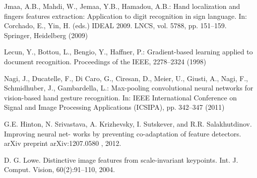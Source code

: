 \documentclass[conference]{IEEEtran}
\begin{document}
%
%
%
\begin{thebibliography}{1}

Jmaa, A.B., Mahdi, W., Jemaa, Y.B., Hamadou, A.B.: Hand localization and fingers features extraction: Application to digit recognition in sign language. In: Corchado, E., Yin, H. (eds.) IDEAL 2009. LNCS, vol. 5788, pp. 151–159. Springer, Heidelberg (2009)

Lecun, Y., Bottou, L., Bengio, Y., Haffner, P.: Gradient-based learning applied to document recognition. Proceedings of the IEEE, 2278–2324 (1998)

Nagi, J., Ducatelle, F., Di Caro, G., Ciresan, D., Meier, U., Giusti, A., Nagi, F.,
Schmidhuber, J., Gambardella, L.: Max-pooling convolutional neural networks for
vision-based hand gesture recognition. In: IEEE International Conference on Signal
and Image Processing Applications (ICSIPA), pp. 342–347 (2011)

G.E. Hinton, N. Srivastava, A. Krizhevsky, I. Sutskever, and R.R. Salakhutdinov. Improving neural net-
works by preventing co-adaptation of feature detectors.
arXiv preprint arXiv:1207.0580
, 2012.

D. G. Lowe. Distinctive image features from scale-invariant keypoints. Int. J. Comput. Vision, 60(2):91–110, 2004.
  
\end{thebibliography}




\end{document}
